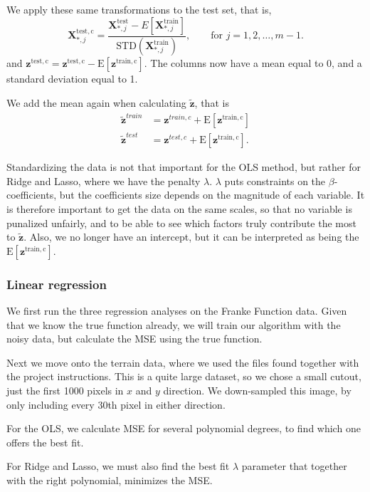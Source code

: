 \documentclass[a4paper,10pt,english]{article}
\begin{document}
We apply these same transformations to the test set, that is,
\begin{equation}
\bm{X}_{*,j}^\mathrm{test,c} = \frac{\bm{X}_{*,j}^\mathrm{test}-E[\bm{X}_{*,j}^\mathrm{train}]}{\mathrm{STD}(\bm{X}_{*,j}^\mathrm{train})}, \qquad\text{for } j=1,2,\dots, m-1.
\end{equation}
and $\bm{z}^\mathrm{test,c}= \bm{z}^\mathrm{test,c}- \mathrm{E}[\bm{z}^\mathrm{train,c}]$. The columns now have a mean equal to 0, and a standard deviation equal to 1.

We add the mean again when calculating $\bm{{\tilde z}}$, that is
\begin{align}
\bm{\tilde z}^{train} &=\bm{z}^{train,c} + \mathrm{E}[\bm{z}^\mathrm{train,c}]\\
\bm{\tilde z}^{test} &=\bm{z}^{test,c} + \mathrm{E}[\bm{z}^\mathrm{train,c}].
\end{align}

Standardizing the data is not that important for the OLS method, but rather for Ridge and Lasso, where we have the penalty $\lambda$. $\lambda$ puts constraints on the $\beta$-coefficients, but the coefficients size depends on the magnitude of each variable.
It is therefore important to get the data on the same scales, so that no variable is punalized unfairly, and to be able to see which factors truly contribute the most to $\bm{\tilde z}$. Also, we no longer have an intercept, but it can be interpreted as being the $\mathrm{E}[\bm{z}^\mathrm{train,c}]$.

\subsubsection{Linear regression}
We first run the three regression analyses on the Franke Function data. Given that we know the true function already, we will train our algorithm with the noisy data, but calculate the MSE using the true function. 

Next we move onto the terrain data, where we used the files found together with the project instructions. This is a quite large dataset, so we chose a small cutout, just the first 1000 pixels in $x$ and $y$ direction. We down-sampled this image, by only including every 30th pixel in either direction.   

For the OLS, we calculate MSE for several polynomial degrees, to find which one offers the best fit.

For Ridge and Lasso, we must also find the best fit $\lambda$ parameter that together with the right polynomial, minimizes the MSE.
\end{document}
